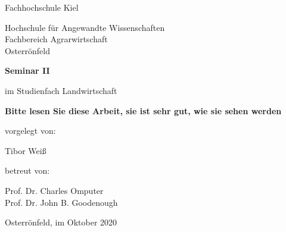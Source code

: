 
\begin{titlepage}
\centering

\begingroup
    \Large{Fachhochschule Kiel}
    \par
\endgroup

\begingroup
    \large{Hochschule für Angewandte Wissenschaften \\
        Fachbereich Agrarwirtschaft \\
        Osterrönfeld}
    \par
\endgroup


\vspace{3cm}


\begingroup
    \Large
    \bfseries{Seminar II}
    \par
\endgroup

\vspace{0.1cm}

im Studienfach Landwirtschaft

\vspace{2cm}

\hrulefill

\vspace{0.5cm}
\begingroup
    \LARGE
    \bfseries{Bitte lesen Sie diese Arbeit, sie ist sehr gut, wie sie sehen werden}
    \par
\endgroup
\vspace{0.5cm}
\hrulefill
\vspace{2cm}

vorgelegt von:

\begingroup
    \large{Tibor Weiß}
    \par
\endgroup

\vspace{1.5cm}

betreut von:

\begingroup
    \large{Prof. Dr. Charles Omputer \\
        Prof. Dr. John B. Goodenough}
    \par
\endgroup

\vspace{1cm}

Osterrönfeld, im Oktober 2020

\end{titlepage}
